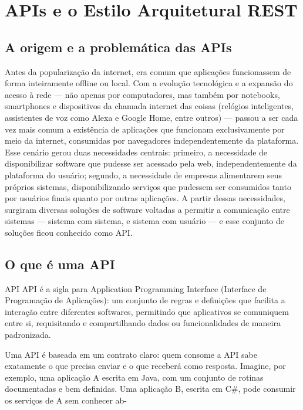\chapter{APIs e o Estilo Arquitetural REST}

\section{A origem e a problemática das APIs}

Antes da popularização da internet, era comum que aplicações funcionassem de forma inteiramente offline ou local. Com a evolução tecnológica e a expansão do acesso à rede — não apenas por computadores, mas também por notebooks, smartphones e dispositivos da chamada internet das coisas (relógios inteligentes, assistentes de voz como Alexa e Google Home, entre outros) — passou a ser cada vez mais comum a existência de aplicações que funcionam exclusivamente por meio da internet, consumidas por navegadores independentemente da plataforma. Esse cenário gerou duas necessidades centrais: primeiro, a necessidade de disponibilizar software que pudesse ser acessado pela web, independentemente da plataforma do usuário; segundo, a necessidade de empresas alimentarem seus próprios sistemas, disponibilizando serviços que pudessem ser consumidos tanto por usuários finais quanto por outras aplicações. A partir dessas necessidades, surgiram diversas soluções de software voltadas a permitir a comunicação entre sistemas — sistema com sistema, e sistema com usuário — e esse conjunto de soluções ficou conhecido como API.

\section{O que é uma API}

\begin{infobox}{API}
API é a sigla para Application Programming Interface (Interface de Programação de Aplicações): um conjunto de regras e definições que facilita a interação entre diferentes softwares, permitindo que aplicativos se comuniquem entre si, requisitando e compartilhando dados ou funcionalidades de maneira padronizada.
\end{infobox}

Uma API é baseada em um contrato claro: quem consome a API sabe exatamente o que precisa enviar e o que receberá como resposta. Imagine, por exemplo, uma aplicação A escrita em Java, com um conjunto de rotinas documentadas e bem definidas. Uma aplicação B, escrita em C\#, pode consumir os serviços de A sem conhecer ab-

